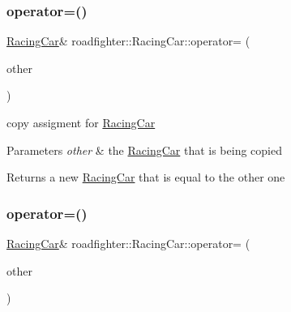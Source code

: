 \mbox{\label{classroadfighter_1_1RacingCar_a2df3fdffc4c55aa85a6d9265913aa7b0}} 
\subsubsection{\texorpdfstring{operator=()}{operator=()}\hspace{0.1cm}{\footnotesize\ttfamily [1/2]}}
{\footnotesize\ttfamily \hyperlink{classroadfighter_1_1RacingCar}{Racing\+Car}\& roadfighter\+::\+Racing\+Car\+::operator= (\begin{DoxyParamCaption}\item[{const \hyperlink{classroadfighter_1_1RacingCar}{Racing\+Car} \&}]{other }\end{DoxyParamCaption})\hspace{0.3cm}{\ttfamily [default]}}

copy assigment for \hyperlink{classroadfighter_1_1RacingCar}{Racing\+Car} 
\begin{DoxyParams}{Parameters}
{\em other} & the \hyperlink{classroadfighter_1_1RacingCar}{Racing\+Car} that is being copied \\
\hline
\end{DoxyParams}
\begin{DoxyReturn}{Returns}
a new \hyperlink{classroadfighter_1_1RacingCar}{Racing\+Car} that is equal to the other one 
\end{DoxyReturn}
\mbox{\label{classroadfighter_1_1RacingCar_a370fa9acf725d13ecb5b96ccce61b9d3}} 
\subsubsection{\texorpdfstring{operator=()}{operator=()}\hspace{0.1cm}{\footnotesize\ttfamily [2/2]}}
{\footnotesize\ttfamily \hyperlink{classroadfighter_1_1RacingCar}{Racing\+Car}\& roadfighter\+::\+Racing\+Car\+::operator= (\begin{DoxyParamCaption}\item[{\hyperlink{classroadfighter_1_1RacingCar}{Racing\+Car} \&\&}]{other }\end{DoxyParamCaption})\hspace{0.3cm}{\ttfamily [default]}}

